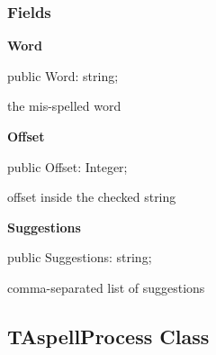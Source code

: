 \documentclass{report}
\newif\ifpdf
\begin{document}
\subsubsection*{\large{\textbf{Fields}}\normalsize\hspace{1ex}\hfill}
\begin{list}{}{
\setlength{\itemindent}{0cm}
\setlength{\listparindent}{0cm}
\setlength{\leftmargin}{\evensidemargin}
\addtolength{\leftmargin}{\tmplength}
\settowidth{\labelsep}{X}
\addtolength{\leftmargin}{\labelsep}
\setlength{\labelwidth}{\tmplength}
}
\label{PasDoc_Aspell.TSpellingError-Word}
\item[\textbf{Word}\hfill]
\ifpdf
\begin{flushleft}
\fi
\begin{ttfamily}
public Word: string;\end{ttfamily}

\ifpdf
\end{flushleft}
\fi


\par the mis{-}spelled word\label{PasDoc_Aspell.TSpellingError-Offset}
\item[\textbf{Offset}\hfill]
\ifpdf
\begin{flushleft}
\fi
\begin{ttfamily}
public Offset: Integer;\end{ttfamily}

\ifpdf
\end{flushleft}
\fi


\par offset inside the checked string\label{PasDoc_Aspell.TSpellingError-Suggestions}
\item[\textbf{Suggestions}\hfill]
\ifpdf
\begin{flushleft}
\fi
\begin{ttfamily}
public Suggestions: string;\end{ttfamily}

\ifpdf
\end{flushleft}
\fi


\par comma{-}separated list of suggestions\end{list}
\ifpdf
\subsection*{\large{\textbf{TAspellProcess Class}}\normalsize\hspace{1ex}\hrulefill}
\else
\end{document}
